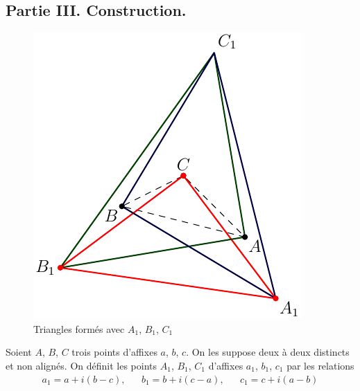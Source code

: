 \subsection*{Partie III. Construction.}
\begin{figure}[h!t]
 \centering
 \includegraphics{./Ecomp12_1.pdf}
 \caption{Triangles formés avec $A_1$, $B_1$, $C_1$}
 \label{fig:Ecomp12_1}
\end{figure}
Soient $A$, $B$, $C$ trois points d'affixes $a$, $b$, $c$. On les suppose deux à deux distincts et non alignés. On définit les points $A_1$, $B_1$, $C_1$ d'affixes $a_1$, $b_1$, $c_1$ par les relations
\begin{align*}
 a_1 = a + i(b-c), & & b_1 = b + i(c-a), & & c_1 = c + i(a-b)
\end{align*}
